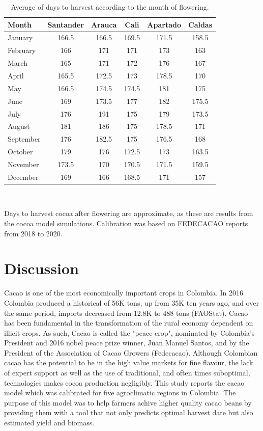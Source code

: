\documentclass[gene,journal,article,submit,moreauthors,pdftex]{Definitions/mdpi}
\begin{document}
\begin{table}[h!]	
	\caption {\footnotesize {Average of days to harvest according to the month of flowering.}}
	\label{tab:harvest} 
	\centering
	\begin{small}
		{\def\arraystretch{2}\tabcolsep=10pt
		\begin{tabular}{l c c c c c }
			\hline
			{\bf Month }&{\bf Santander }&{\bf Arauca}&{\bf Cali}&{\bf Apartado}&{\bf Caldas}\\
			\hline
			January    & 166.5 & 166.5 & 169.5& 171.5 & 158.5 \\
			February   & 166 & 171 & 171 & 173 & 163  \\
			March      & 165 & 171 & 172 & 176 & 167  \\
			April      & 165.5 & 172.5 & 173& 178.5 & 170   \\
			May       & 166.5 & 174.5 & 174.5&  181& 175   \\
			June      & 169 & 173.5 & 177&  182& 175.5   \\
			July      & 176 & 191 & 175& 179 & 173.5  \\
			August    & 181 & 186 & 175& 178.5 & 171   \\
			September   & 176 & 182.5 & 175& 176.5 & 168   \\
			October    & 179 & 176 & 172.5& 173 & 163.5   \\
			November   & 173.5 & 170 & 170.5&171.5 & 159.5   \\
			December   & 169 & 166 & 168.5& 171 & 157  \\
			\hline
		\end{tabular} \\
	}
		{\footnotesize Days to harvest cocoa after flowering are approximate, as these are results from the cocoa model simulations. Calibration was based on FEDECACAO reports from 2018 to 2020. } 
	\end{small}
\end{table}

\section{Discussion}


Cacao is one of the most economically important crops in Colombia. In 2016 Colombia produced a historical of 56K tons, up from 35K ten years ago, and over the same period, imports decreased from 12.8K to 488 tons (FAOStat). Cacao has been fundamental in the transformation of the rural economy dependent on illicit crops. As such, Cacao is called the "peace crop", nominated by  Colombia's President and 2016 nobel peace prize winner, Juan Manuel Santos, and by the President of the Association of Cacao Growers (Fedecacao). Although Colombian cacao has the potential to be in the high value markets for fine flavour, the lack of expert support as well as the use of traditional, and often times suboptimal, technologies makes cocoa production negligibly. This study reports the cacao model which was calibrated for five agroclimatic regions in Colombia. The purpose of this model was to help farmers achive  higher quality cacao beans by providing them with a tool that not only predicts optimal harvest date but also estimated yield and biomass. 
\end{document}
